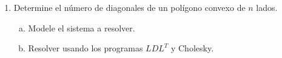 \documentclass[
	spanish,
	8pt,
	utf8,
	xcolor=table,
	handout,
	aspectratio=169,
	professionalfonts,
	notheorems,
	mathserif,
]{beamer}
\newcounter{savedenum}
\newcommand*{\saveenum}{\setcounter{savedenum}{\theenumi}}
\begin{document}
\begin{frame}
\begin{enumerate}
		\item

		      Determine el número de diagonales de un polígono convexo de $n$ lados.

		      \begin{multicols}{2}

			      \begin{enumerate}[a)]
				      \item

				            Modele el sistema a resolver.

				      \item

				            Resolver usando los programas $LDL^{T}$ y Cholesky.
			      \end{enumerate}
		      \end{multicols}
		      \saveenum
	\end{enumerate}
\end{frame}
\end{document}
